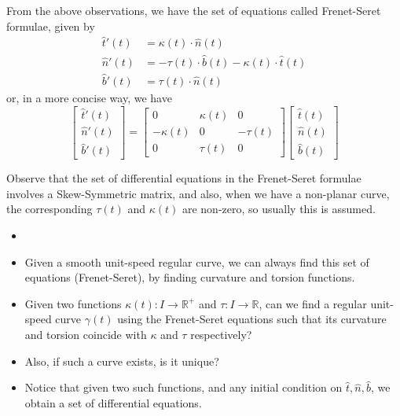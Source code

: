 \begin{theorem}
    From the above observations, we have the set of equations called Frenet-Seret formulae, given by
    $$
    \begin{aligned}
        \hat{t}'(t)&=\kappa(t)\cdot \hat{n}(t)\\ 
        \hat{n}'(t)&=-\tau(t)\cdot \hat{b}(t)-\kappa(t)\cdot \hat{t}(t)\\
        \hat{b}'(t)&=\tau(t)\cdot \hat{n}(t)
    \end{aligned}$$
    or, in a more concise way, we have 
    $$
    \begin{bmatrix}
        \hat{t}'(t)\\ 
        \hat{n}'(t)\\ 
        \hat{b}'(t)
    \end{bmatrix}
    =
    \begin{bmatrix}
        0 & \kappa(t) & 0\\ 
        -\kappa(t) & 0 & -\tau(t)\\ 
        0 & \tau(t) & 0
    \end{bmatrix}
    \begin{bmatrix}
        \hat{t}(t)\\
        \hat{n}(t)\\
        \hat{b}(t)
    \end{bmatrix}
    $$
\end{theorem}
\vspace{0.4cm}
\begin{observe}
    Observe that the set of differential equations in the Frenet-Seret formulae involves a Skew-Symmetric matrix, and also, when we have a non-planar curve, the corresponding $\tau(t)$ and $\kappa(t)$ are non-zero, so usually this is assumed.
\end{observe}
\vspace{0.4cm}
\begin{motive}
    \begin{itemize}
        \item []
        \item Given a smooth unit-speed regular curve, we can always find this set of equations (Frenet-Seret), by finding curvature and torsion functions.
        \item Given two functions $\kappa(t):I\to \mathbb{R}^{+}$ and $\tau:I\to \mathbb{R}$, can we find a regular unit-speed curve $\gamma(t)$ using the Frenet-Seret equations such that its curvature and torsion coincide with $\kappa$ and $\tau$ respectively?
        \item Also, if such a curve exists, is it unique?
        \item Notice that given two such functions, and any initial condition on $\hat{t}, \hat{n}, \hat{b}$, we obtain a set of differential equations.
    \end{itemize}
\end{motive}

